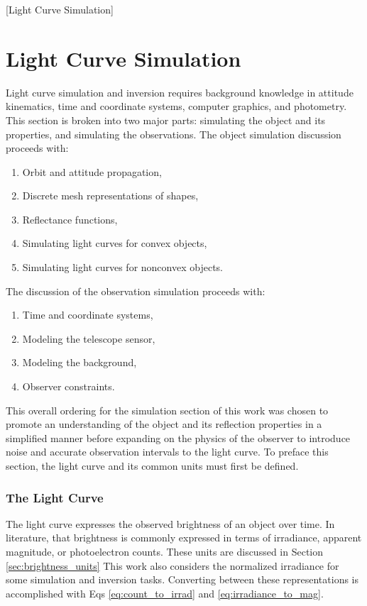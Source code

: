[Light Curve Simulation]

\chapter{Light Curve Simulation}

Light curve simulation and inversion requires background knowledge in attitude kinematics, time and coordinate systems, computer graphics, and photometry. This section is broken into two major parts: simulating the object and its properties, and simulating the observations. The object simulation discussion proceeds with:

\begin{enumerate}
  \item Orbit and attitude propagation,
  \item Discrete mesh representations of shapes,
  \item Reflectance functions,
  \item Simulating light curves for convex objects,
  \item Simulating light curves for nonconvex objects.
\end{enumerate}

\noindent The discussion of the observation simulation proceeds with:

\begin{enumerate}
  \item Time and coordinate systems,
  \item Modeling the telescope sensor,
  \item Modeling the background,
  \item Observer constraints.
\end{enumerate}

This overall ordering for the simulation section of this work was chosen to promote an understanding of the object and its reflection properties in a simplified manner before expanding on the physics of the observer to introduce noise and accurate observation intervals to the light curve. To preface this section, the light curve and its common units must first be defined.

\subsection{The Light Curve}

The light curve expresses the observed brightness of an object over time. In literature, that brightness is commonly expressed in terms of irradiance, apparent magnitude, or photoelectron counts. These units are discussed in Section \ref{sec:brightness_units} This work also considers the normalized irradiance for some simulation and inversion tasks. Converting between these representations is accomplished with Eqs \ref{eq:count_to_irrad} and \ref{eq:irradiance_to_mag}.

